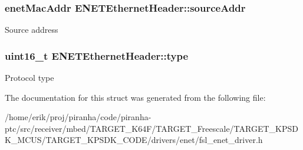 \subsubsection[{\texorpdfstring{source\+Addr}{sourceAddr}}]{\setlength{\rightskip}{0pt plus 5cm}enet\+Mac\+Addr E\+N\+E\+T\+Ethernet\+Header\+::source\+Addr}\hypertarget{structENETEthernetHeader_ab63793c54bf1ccd5d9c4b6b595033ded}{}\label{structENETEthernetHeader_ab63793c54bf1ccd5d9c4b6b595033ded}
Source address 
\subsubsection[{\texorpdfstring{type}{type}}]{\setlength{\rightskip}{0pt plus 5cm}uint16\+\_\+t E\+N\+E\+T\+Ethernet\+Header\+::type}\hypertarget{structENETEthernetHeader_ae406ebfac78cda3771818ea5ada0472f}{}\label{structENETEthernetHeader_ae406ebfac78cda3771818ea5ada0472f}
Protocol type 

The documentation for this struct was generated from the following file\+:\begin{DoxyCompactItemize}
\item 
/home/erik/proj/piranha/code/piranha-\/ptc/src/receiver/mbed/\+T\+A\+R\+G\+E\+T\+\_\+\+K64\+F/\+T\+A\+R\+G\+E\+T\+\_\+\+Freescale/\+T\+A\+R\+G\+E\+T\+\_\+\+K\+P\+S\+D\+K\+\_\+\+M\+C\+U\+S/\+T\+A\+R\+G\+E\+T\+\_\+\+K\+P\+S\+D\+K\+\_\+\+C\+O\+D\+E/drivers/enet/fsl\+\_\+enet\+\_\+driver.\+h\end{DoxyCompactItemize}
